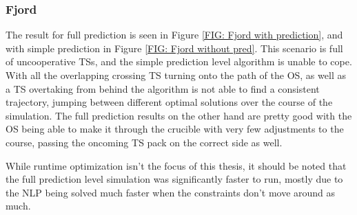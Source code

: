 \subsubsection{Fjord}

The result for full prediction is seen in Figure \ref{FIG: Fjord with prediction}, and
with simple prediction in Figure \ref{FIG: Fjord without pred}. This scenario is full of uncooperative TSs, and the simple prediction level
algorithm is unable to cope. With all the overlapping crossing TS turning onto the path of the OS, as well as a TS overtaking from behind the algorithm
is not able to find a consistent trajectory, jumping between different optimal solutions over the course of the simulation.
The full prediction results on the other hand are pretty good with the OS being able to make it through the crucible with
very few adjustments to the course, passing the oncoming TS pack on the correct side as well.

While runtime optimization isn't the focus of this thesis, it should be noted that the full prediction level simulation was significantly
faster to run, mostly due to the \gls{NLP} being solved much faster when the constraints don't move around as much.


